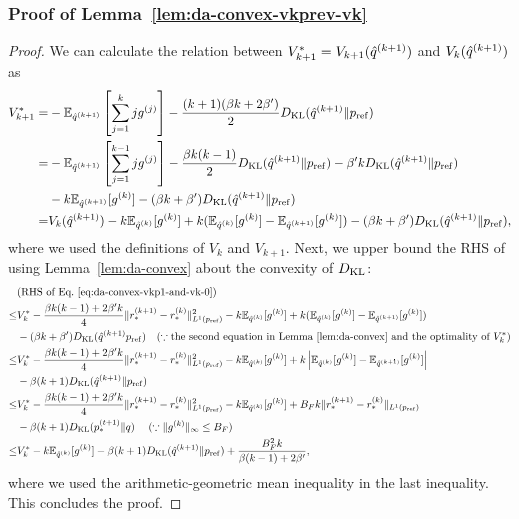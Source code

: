 \subsubsection{Proof of Lemma~\ref{lem:da-convex-vkprev-vk}\label{sec:da-convex-lem}}\label{sec:AppendixNonconvexConv}
   \begin{proof}
      We can calculate the relation between $V_{k+1}^* = V_{k+1}(\hat{q}^{(k+1)})$ and $V_{k}(\hat{q}^{(k+1)})$ as
      \begin{align}
        V_{k+1}^* =& - \mathbb{E}_{\hat{q}^{(k+1)}}\left[\sum_{j=1}^{k}j g^{(j)}\right] - \frac{(k+1)( \beta k + 2 \beta') }{2}D_{\mathrm{KL}}(\hat{q}^{(k+1)} \|p_{\rm{ref}})\\
        =& - \mathbb{E}_{\hat{q}^{(k+1)}}\left[\sum_{j=1}^{k-1}j g^{(j)}\right] - \frac{\beta k (k-1)}{2}D_{\mathrm{KL}}(\hat{q}^{(k+1)} \|p_{\rm{ref}}) 
        - \beta' k D_{\mathrm{KL}}(\hat{q}^{(k+1)}\|p_{\rm{ref}})
        \\
        &- k\mathbb{E}_{\hat{q}^{(k+1)}}[g^{(k)}]  - (\beta k + \beta') D_{\mathrm{KL}}(\hat{q}^{(k+1)} \|p_{\rm{ref}}) \\
        = & V_{k}(\hat{q}^{(k+1)}) - k \mathbb{E}_{\hat{q}^{(k)}}[g^{(k)}]+ k(\mathbb{E}_{\hat{q}^{(k)}}[g^{(k)}]-\mathbb{E}_{\hat{q}^{(k+1)}}[g^{(k)}]) - (\beta k+\beta')D_{\mathrm{KL}}(\hat{q}^{(k+1)}\|p_{\rm{ref}}),\label{eq:da-convex-vkp1-and-vk-0}
      \end{align}
where we used the definitions of $V_k$ and $V_{k+1}$.
Next, we upper bound the RHS of  using Lemma~\ref{lem:da-convex} about the convexity of $D_{\mathrm{KL}}$:
      \begin{align}
        &(\text{RHS of \Eqref{eq:da-convex-vkp1-and-vk-0}})\\
        \leq& V_{k}^* - \frac{\beta k (k-1) + 2 \beta' k }{4}\|\rstarknext - \rstark\|_{L^1(\pref)}^2
        -k \E_{\qstark}[g^{(k)}]+ k(\E_{\qstark}[g^{(k)}]-\E_{\qstarnext}[g^{(k)}])\nonumber \\
        &- ( \beta k+\beta')\KL(\qstarnext\pref)\quad (\because \text{the second equation in Lemma~\ref{lem:da-convex} and the optimality of $V_k^*$})\\
        \leq& V_{k}^* -  \frac{\beta k (k-1) + 2 \beta' k }{4}\|\rstarknext - \rstark\|_{L^1(\pref)}^2  -k \E_{\qstark}[g^{(k)}]+ k\left|\E_{\qstark}[g^{(k)}]-\E_{\qstarnext}[g^{(k)}]\right|\nonumber  \\
        &- \beta(k+1)\KL(\qstarnext\|\pref)\\
        \leq& V_{k}^* - \frac{\beta k (k-1) + 2 \beta' k }{4}\|\rstarknext - \rstark\|_{L^1(\pref)}^2 -k \E_{\qstark}[g^{(k)}]+ B_F k\|\rstarknext - \rstark\|_{L^1(\pref)}\nonumber \\
        &- \beta(k+1)\KL(p_*^{(t+1)}\|q)\; \quad (\because \|g^{(k)}\|_\infty \leq B_F) \\
        \leq& V_{k}^* - k\E_{\qstark}[g^{(k)}] - \beta(k+1)\KL(\qstarnext\|\pref) + \frac{B_F^2k}{\beta (k-1) + 2\beta' }, %
      \end{align}
      where we used the arithmetic-geometric mean inequality in the last inequality. 
      This concludes the proof. 
  \end{proof}

